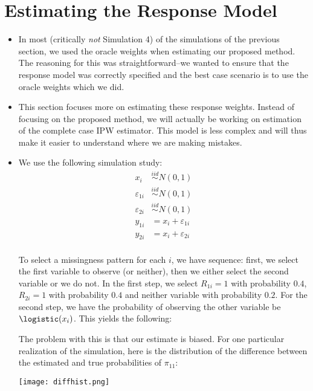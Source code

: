 \section*{Estimating the Response Model}

\begin{itemize}
  \item In most (critically \textit{not} Simulation 4) of the simulations of the
    previous section, we used the oracle weights when estimating our proposed
    method. The reasoning for this was straightforward{--}we wanted to ensure
    that the response model was correctly specified and the best case scenario
    is to use the oracle weights which we did.
    
  \item This section focuses more on estimating these response weights. Instead
    of focusing on the proposed method, we will actually be working on
    estimation of the complete case IPW estimator. This model is less complex
    and will thus make it easier to understand where we are making mistakes.

  \item We use the following simulation study:
    \begin{align*}
      x_i &\stackrel{iid}{\sim} N(0, 1)\\
      \varepsilon_{1i} &\stackrel{iid}{\sim} N(0, 1)\\
      \varepsilon_{2i} &\stackrel{iid}{\sim} N(0, 1)\\
      y_{1i} &= x_i + \varepsilon_{1i} \\
      y_{2i} &= x_i + \varepsilon_{2i} \\
    \end{align*}

    To select a missingness pattern for each $i$, we have sequence: first, we
    select the first variable to observe (or neither), then we either select the
    second variable or we do not. In the first step, we select $R_{1i} = 1$ with
    probability $0.4$, $R_{2i} = 1$ with probability $0.4$ and neither variable
    with probability $0.2$. For the second step, we have the probability of
    observing the other variable be $\logistic(x_i)$. This yields the following:

    

    The problem with this is that our estimate is biased. For one particular
    realization of the simulation, here is the distribution of the difference
    between the estimated and true probabilities of $\pi_{11}$:

    \texttt{[image: diffhist.png]}
  
\end{itemize}

\newpage

